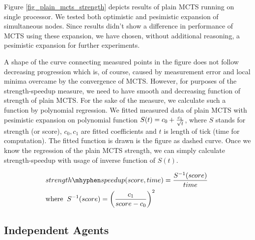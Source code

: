 Figure \ref{fig_plain_mcts_strength} depicts results of plain MCTS running on single processor.
We tested both optimistic and pesimistic expansion of simultaneous nodes. Since results didn't 
show a difference in performance of MCTS using these expansion, we have chosen, without
additional reasoning, a pesimistic expansion for further experiments.

A shape of the curve connecting measured points in the figure does not follow decreasing
progression which is, of course, caused by measurement error and local minima overcame by the
convergence of MCTS. However, for purposes of the strength-speedup measure, we need to have
smooth and decreasing function of strength of plain MCTS. For the sake of the measure, we
calculate such a function by polynomial regression. We fitted measured data of plain MCTS with
pesimistic expansion on polynomial function $S(t) = c_0 + { c_1 \over \sqrt{t} }$, where $S$ stands
for strength (or score), $c_0,c_1$ are fitted
coefficients and $t$ is length of tick (time for computation). The fitted function is drawn is
the figure as dashed curve. Once we know the regression of the plain MCTS strength, we can
simply calculate strength-speedup with usage of inverse function of $S(t)$.


\begin{align}
    &\begin{aligned}
        strength\mhyphen speedup(score, time) = {{ S^{-1}(score) } \over time }\;
    \end{aligned}\\
    &\begin{aligned}
        \mathrm{where}\;\;S^{-1}(score) = {\left({c_1 \over {score - c_0}}\right)}^2
    \end{aligned}
\end{align}



\subsection{Independent Agents}


